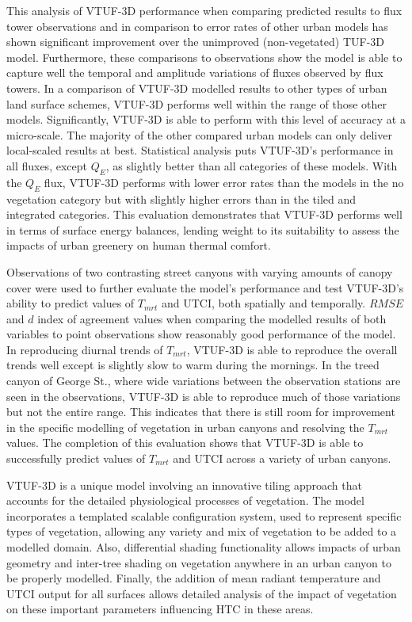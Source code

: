 \documentclass[final,3p,times,authoryear]{elsarticle}
\begin{document}
This analysis of VTUF-3D performance when comparing predicted results to flux tower observations and in comparison to error rates of other urban models has shown significant improvement over the unimproved (non-vegetated) TUF-3D model. Furthermore, these comparisons to observations show the model is able to capture well the temporal and amplitude variations of fluxes observed by flux towers. In a comparison of VTUF-3D modelled results to other types of urban land surface schemes, VTUF-3D performs well within the range of those other models. Significantly, VTUF-3D is able to perform with this level of accuracy at a micro-scale. The majority of the other compared urban models can only deliver local-scaled results at best. Statistical analysis puts VTUF-3D's performance in all fluxes, except $Q_{E}$, as slightly better than all categories of these models. With the $Q_{E}$ flux, VTUF-3D performs with lower error rates than the models in the no vegetation category but with slightly higher errors than in the tiled and integrated categories. This evaluation demonstrates that VTUF-3D performs well in terms of surface energy balances, lending weight to its suitability to assess the impacts of urban greenery on human thermal comfort.

Observations of two contrasting street canyons with varying amounts of canopy cover were used to further evaluate the model's performance and test VTUF-3D's ability to predict values of $T_{mrt}$ and UTCI, both spatially and temporally. $RMSE$ and $d$ index of agreement values when comparing the modelled results of both variables to point observations show reasonably good performance of the model. In reproducing diurnal trends of $T_{mrt}$, VTUF-3D is able to reproduce the overall trends well except is slightly slow to warm during the mornings. In the treed canyon of George St., where wide variations between the observation stations are seen in the observations, VTUF-3D is able to reproduce much of those variations but not the entire range. This indicates that there is still room for improvement in the specific modelling of vegetation in urban canyons and resolving the $T_{mrt}$ values. The completion of this evaluation shows that VTUF-3D is able to successfully predict values of $T_{mrt}$ and UTCI across a variety of urban canyons.

VTUF-3D is a unique model involving an innovative tiling approach that accounts for the detailed physiological processes of vegetation. The model incorporates a templated scalable configuration system, used to represent specific types of vegetation, allowing any variety and mix of vegetation to be added to a modelled domain. Also, differential shading functionality allows impacts of urban geometry and inter-tree shading on vegetation anywhere in an urban canyon to be properly modelled. Finally, the addition of mean radiant temperature and UTCI output for all surfaces allows detailed analysis of the impact of vegetation on these important parameters influencing HTC in these areas.
\end{document}
